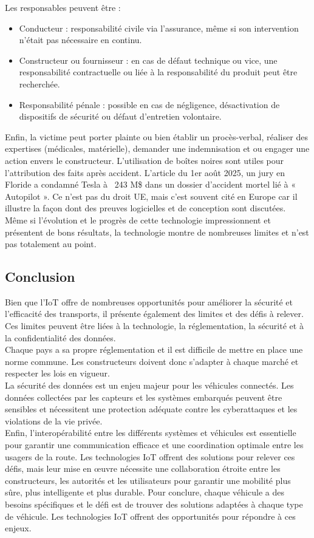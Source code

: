 Les responsables peuvent être :
\begin{itemize}
    \item Conducteur : responsabilité civile via l’assurance, même si son intervention n’était pas nécessaire en continu.
    \item Constructeur ou fournisseur : en cas de défaut technique ou vice, une responsabilité contractuelle ou liée à la responsabilité du produit peut être recherchée.
    \item Responsabilité pénale : possible en cas de négligence, désactivation de dispositifs de sécurité ou défaut d’entretien volontaire.
\end{itemize}
Enfin, la victime peut porter plainte ou bien établir un procès-verbal, réaliser des expertises (médicales, matérielle), demander une indemnisation et ou engager une action envers le constructeur. L'utilisation de boîtes noires sont utiles pour l’attribution des faits après accident. L'article\cite{tesla_condamnation} du 1er août 2025, un jury en Floride a condamné Tesla à ~243 M\$ dans un dossier d’accident mortel lié à « Autopilot ». Ce n’est pas du droit UE, mais c’est souvent cité en Europe car il illustre la façon dont des preuves logicielles et de conception sont discutées.\\
Même si l'évolution et le progrès de cette technologie impressionnent et présentent de bons résultats, la technologie montre de nombreuses limites et n'est pas totalement au point.

\newpage
\subsection{Conclusion}
Bien que l’IoT offre de nombreuses opportunités pour améliorer la sécurité et l’efficacité des transports, il présente également des limites et des défis à relever. Ces limites peuvent être liées à la technologie, la réglementation, la sécurité et à la confidentialité des données.\\
Chaque pays a sa propre réglementation et il est difficile de mettre en place une norme commune. Les constructeurs doivent donc s'adapter à chaque marché et respecter les lois en vigueur.\\
La sécurité des données est un enjeu majeur pour les véhicules connectés. Les données collectées par les capteurs et les systèmes embarqués peuvent être sensibles et nécessitent une protection adéquate contre les cyberattaques et les violations de la vie privée.\\
Enfin, l'interopérabilité entre les différents systèmes et véhicules est essentielle pour garantir une communication efficace et une coordination optimale entre les usagers de la route. Les technologies IoT offrent des solutions pour relever ces défis, mais leur mise en œuvre nécessite une collaboration étroite entre les constructeurs, les autorités et les utilisateurs pour garantir une mobilité plus sûre, plus intelligente et plus durable.
Pour conclure, chaque véhicule a des besoins spécifiques et le défi est de trouver des solutions adaptées à chaque type de véhicule. Les technologies IoT offrent des opportunités pour répondre à ces enjeux.\\